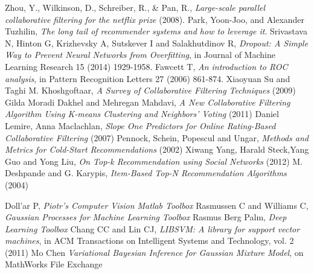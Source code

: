 \documentclass[10pt,a4paper]{article}
\begin{document}
    \begin{thebibliography}{99}
       Zhou, Y., Wilkinson, D., Schreiber, R., \& Pan, R., \textit{Large-scale parallel collaborative filtering for the netflix prize} (2008).
       Park, Yoon-Joo, and Alexander Tuzhilin, \textit{The long tail of recommender systems and how to leverage it}.
       Srivastava N, Hinton G, Krizhevsky A, Sutskever I and Salakhutdinov R, \textit{Dropout: A Simple Way to Prevent Neural Networks from Overfitting}, in Journal of Machine Learning Research 15 (2014) 1929-1958.
       Fawcett T, \textit{An introduction to ROC analysis}, in Pattern Recognition Letters 27 (2006) 861-874.
       Xiaoyuan Su and Taghi M. Khoshgoftaar, \textit{A Survey of Collaborative Filtering Techniques} (2009)
       Gilda Moradi Dakhel and Mehregan Mahdavi, \textit{A New Collaborative Filtering Algorithm Using K-means Clustering and Neighbors’ Voting} (2011)
       Daniel Lemire, Anna Maclachlan, \textit{Slope One Predictors for Online Rating-Based Collaborative Filtering} (2007)
       Pennock, Schein, Popescul and Ungar, \textit{Methods and Metrics for Cold-Start Recommendations} (2002)
       Xiwang Yang, Harald Steck,Yang Guo and Yong Liu, \textit{On Top-k Recommendation using Social Networks} (2012)
       M. Deshpande and G. Karypis, \textit{Item-Based Top-N Recommendation Algorithms} (2004)

       Doll'ar P, \textit{Piotr's Computer Vision Matlab Toolbox}
       Rasmussen C and Williams C, \textit{Gaussian Processes for Machine Learning Toolbox}
       Rasmus Berg Palm, \textit{Deep Learning Toolbox}
       Chang CC and Lin CJ, \textit{LIBSVM: A library for support vector machines}, in ACM Transactions on Intelligent Systems and Technology, vol. 2 (2011)
       Mo Chen \textit{Variational Bayesian Inference for Gaussian Mixture Model}, on MathWorks File Exchange

    \end{thebibliography}
\end{document}
